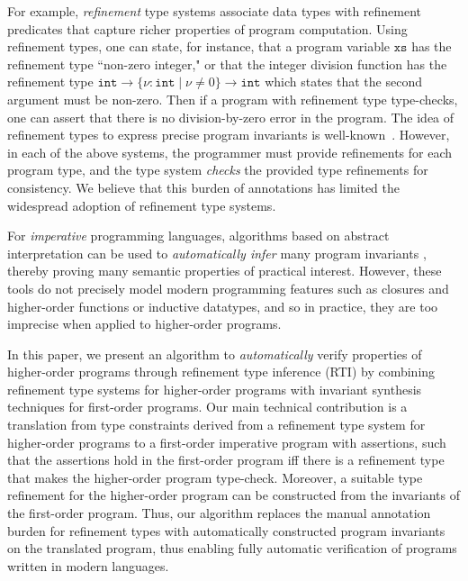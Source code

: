 \documentclass[nocopyrightspace]{sigplanconf}
\def\set#1{{\{ #1\}}}
\newcommand{\ttxs}{\mathtt{xs}}
\def\ttxs{\mathtt{xs}}
\def\valu{\nu}
\newcommand{\ftyp}[2]{{{#1}\!:\!{#2}}}
\def\ttint{\mathtt{int}}
\newcommand{\reftyp}[3]{\set{\ftyp{{#1}}{{#2}} \mid {#3}}}
\begin{document}
For example, \emph{refinement} type systems \cite{XiPfenning99} 
associate data types with refinement predicates that capture richer properties of
program computation.
Using refinement types, one can state, for instance, that a program variable $\ttxs$ has the refinement type
``non-zero integer," or that the integer division function has the refinement type 
$\ttint \rightarrow \reftyp{\valu}{\ttint}{\valu \not = 0} \rightarrow \ttint$ 
which states that the second argument must be non-zero.
Then if a program with refinement type type-checks, one can assert that there is no
division-by-zero error in the program.
The idea of refinement types to express precise program invariants is
well-known~\cite{XiPfenning99,Ou2004,ATS,Dunfield,Flanagan06,GordonRefinement09}.
However, in each of the above systems, the programmer must provide refinements for
each program type, and the type system {\em checks} the provided type refinements for
consistency.
We believe that this burden of annotations has limited the widespread adoption of refinement
type systems.

For {\em imperative} programming languages, algorithms based on abstract interpretation
can be used to {\em automatically infer} many program invariants 
\cite{SLAMPOPL02,HJMM04,CousotPLDI03}, thereby proving many semantic properties of practical interest.
However, these tools do not precisely model modern programming features such as closures
and higher-order functions or inductive datatypes, and so in practice, they
are too imprecise when applied to higher-order programs.

In this paper, we present an algorithm to {\em automatically} 
verify properties of higher-order programs through
refinement type inference (RTI) by
combining refinement type systems for higher-order programs
with invariant synthesis techniques for first-order programs.
Our main technical contribution is a translation 
from type constraints derived from a refinement type system for
higher-order programs to a first-order imperative program with assertions,
such that the assertions hold in the first-order program
iff there is a refinement type that makes the higher-order program
type-check.
Moreover, a suitable type refinement for the higher-order program
can be constructed from the invariants of the first-order program.
Thus, our algorithm replaces the manual annotation burden for refinement types with
automatically constructed program invariants on the translated program,
thus enabling fully automatic verification of programs written 
in modern languages.
\end{document}
